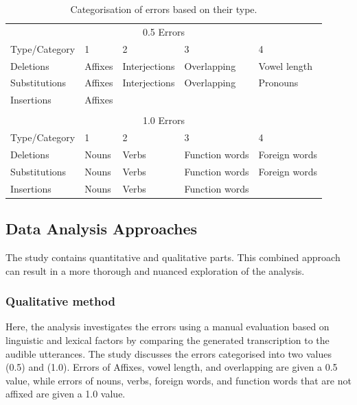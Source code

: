 \documentclass[english]{textolivre}
\begin{document}
\begin{table}[htbp]
\centering
\begin{threeparttable}
\caption{Categorisation of errors based on their type.}
\label{tbl02}
\begin{tabular}{lllll}
\multicolumn{5}{c}{0.5 Errors} \\
	Type/Category & 1 & 2 & 3 & 4 \\
\midrule
Deletions & Affixes & Interjections & Overlapping & Vowel length \\
Substitutions & Affixes & Interjections & Overlapping & Pronouns \\
Insertions & Affixes \\
&&&&\\
\multicolumn{5}{c}{1.0 Errors} \\
Type/Category & 1 & 2 & 3 & 4 \\
\midrule
Deletions & Nouns & Verbs & Function words & Foreign words \\
Substitutions & Nouns & Verbs & Function words & Foreign words \\
Insertions & Nouns & Verbs & Function words \\
\bottomrule
\end{tabular}
\end{threeparttable}
\end{table}
	
	


\subsection{Data Analysis Approaches}\label{subsec-Data-Analysis-Approaches}
	
The study contains quantitative and qualitative parts. This combined
approach can result in a more thorough and nuanced exploration of the
analysis.


\subsubsection{Qualitative method}\label{subsubsec-Qualitative-method}

Here, the analysis investigates the errors using a manual evaluation
based on linguistic and lexical factors by comparing the generated
transcription to the audible utterances. The study discusses the errors
categorised into two values (0.5) and (1.0). Errors of Affixes, vowel
length, and overlapping are given a 0.5 value, while errors of nouns,
verbs, foreign words, and function words that are not affixed are given
a 1.0 value.
\end{document}
